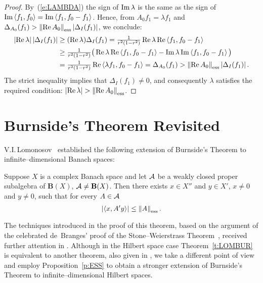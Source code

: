 \begin{proof}
By~(\ref{e:LAMBDA}) the sign of $\operatorname{Im}\lambda$ is the same as the
sign of $\operatorname{Im}\left<f_1,f_0\right>=\operatorname{Im}\left<f_1,f_0-f_1\right>$. Hence, from
$A_0f_1=\lambda{}f_1$ and
$\Delta_{A_0}(f_1)>\essnorm{\RE{}A_0}\abs{\Delta_I(f_1)}$, we
conclude:
\begin{equation*}
\begin{split}
   \abs{\RE\lambda}\abs{\Delta_I(f_1)} &\geq (\RE\lambda)\Delta_I(f_1) =
       \tfrac{1}{r^2(1-r^2)}\RE\lambda \RE\seq{f_1, f_0-f_1} \\
 &\geq \tfrac{1}{r^2(1-r^2)}\big(\RE\lambda\RE\seq{f_1, f_0-f_1}-
                                 \IM\lambda\IM\seq{f_1, f_0-f_1}\big) \\
 &= \tfrac{1}{r^2(1-r^2)}\RE\seq{\lambda f_1,f_0-f_1} = \Delta_{A_0}(f_1)
  > \essnorm{\RE{}A_0}\abs{\Delta_I(f_1)}.
\end{split}
\end{equation*}
The strict inequality implies that $\Delta_I(f_1)\neq0$, and
consequently $\lambda$ satisfies the required condition:
$\abs{\RE\lambda}>\essnorm{\RE{}A_0}$.
\end{proof}

\goodbreak
\section{Burnside's Theorem Revisited}

V.I.\,Lomonosov~\cite{Lom91} established the following
extension of Burnside's Theorem to infinite--dimensional Banach
spaces:

\begin{thm}[V.I.\,Lomonosov, 1991]\label{t:LOMBUR}
Suppose $X$ is a complex Banach space and let ${\cal A}$ be a weakly
closed proper subalgebra of $\mathbf{B}(X)$,
${\cal A}\neq\mathbf{B}(X)$. Then there exists $x\in{X''}$ and
$y\in{X'}$, $x\neq0$ and $y\neq0$, such that for every $A\in{\cal A}$
\begin{equation}\label{e:LB}
 \abs{\seq{x,A'y}}\leq\essnorm{A}.
\end{equation}
\end{thm}

\medskip

The techniques introduced in the proof of this theorem, based
on the argument of the celebrated de~Branges' proof of the
Stone--Weierstrass Theorem~\cite{dB59}, received further
attention in \cite{AAB95,dB93}. Although in the Hilbert space
case Theorem~\ref{t:LOMBUR} is equivalent to another theorem,
also given in \cite{Lom91}, we take a different point of view
and employ Proposition~\ref{p:ESS} to obtain a stronger
extension of Burnside's Theorem to infinite--dimensional
Hilbert spaces.

